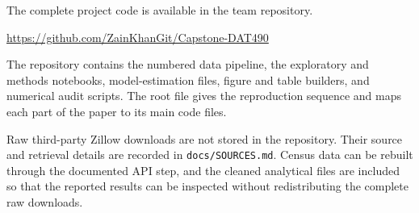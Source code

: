 \documentclass[11pt]{article}
\begin{document}
The complete project code is available in the team repository.
\begin{center}
\url{https://github.com/ZainKhanGit/Capstone-DAT490}
\end{center}
The repository contains the numbered data pipeline, the exploratory and methods notebooks, model-estimation files, figure and
table builders, and numerical audit scripts. The root file
 gives the reproduction sequence and maps each part of the paper to its main code files.

Raw third-party Zillow downloads are not stored in the repository. Their source and retrieval details are recorded in
\texttt{docs/SOURCES.md}. Census data can be rebuilt through the documented API step, and the cleaned analytical files are
included so that the reported results can be inspected without redistributing the complete raw downloads.
\end{document}
